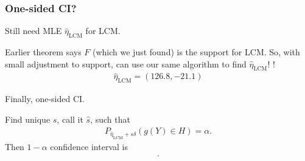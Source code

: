 \documentclass[slidestop,compress, 10pt]{beamer}
\newcommand{\etaLCM}{\hat{\eta}_{\textrm{LCM}}}
\newcommand{\yobs}{y_{\text{obs}}}
\begin{document}
%
%
%
%
%
%


\frame
{
\frametitle{One-sided CI?}  
Still need MLE $\etaLCM$ for LCM.
\pause

Earlier theorem says $F$ (which we just found) is the support for LCM.
So, with small adjustment to support, can use our same algorithm to find $\etaLCM$!   \checkmark!
\vspace{2mm}
\begin{align*}
	\etaLCM = (126.8, -21.1)
\end{align*}

Finally, one-sided CI.
\pause

Find unique $s$, call it $\hat{s}$, such that
\begin{align*}
		P_{\etaLCM + s \delta}( g(Y) \in H) = \alpha.
\end{align*}
Then $1- \alpha$ confidence interval is
\begin{align*}
[ \etaLCM + \hat{s} \delta, + \infty)
\end{align*}

In this example, we calculate a non-simultaneous 95\% confidence region
\begin{align*}
	[9.145, +\infty) \\
	(-\infty, -1.500].
\end{align*}
}
\end{document}
